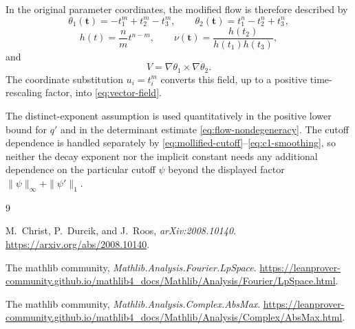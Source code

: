 \documentclass[11pt,a4paper]{article}
\begin{document}
In the original parameter coordinates, the modified flow is therefore
described by
\[
\theta_1(\mathbf t)=-t_1^m+t_2^m-t_3^m,\qquad
\theta_2(\mathbf t)=t_1^n-t_2^n+t_3^n,
\]
\[
h(t)=\frac nm t^{n-m},\qquad
\nu(\mathbf t)=\frac{h(t_2)}{h(t_1)h(t_3)},
\]
and
\[
V=\nabla\theta_1\times\nabla\theta_2.
\]
The coordinate substitution $u_i=t_i^m$ converts this field, up to a
positive time-rescaling factor, into \eqref{eq:vector-field}.

The distinct-exponent assumption is used quantitatively in the positive
lower bound for $q'$ and in the determinant estimate
\eqref{eq:flow-nondegeneracy}. The cutoff dependence is handled separately
by \eqref{eq:mollified-cutoff}--\eqref{eq:c1-smoothing}, so neither the decay
exponent nor the implicit constant needs any additional dependence on the
particular cutoff $\psi$ beyond the displayed factor
$\|\psi\|_\infty+\|\psi'\|_1$.

\begin{thebibliography}{9}
\raggedright

M.~Christ, P.~Durcik, and J.~Roos,
\emph{arXiv:2008.10140}.
\url{https://arxiv.org/abs/2008.10140}.

The mathlib community,
\emph{Mathlib.Analysis.Fourier.LpSpace}.
\url{https://leanprover-community.github.io/mathlib4_docs/Mathlib/Analysis/Fourier/LpSpace.html}.

The mathlib community,
\emph{Mathlib.Analysis.Complex.AbsMax}.
\url{https://leanprover-community.github.io/mathlib4_docs/Mathlib/Analysis/Complex/AbsMax.html}.

\end{thebibliography}
\end{document}
